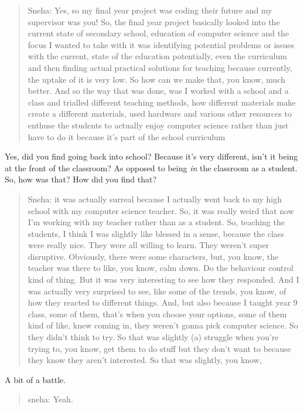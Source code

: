 \documentclass[
]{book}
\begin{document}
\begin{quote}
Sneha: Yes, so my final year project was coding their future and my supervisor was you! So, the final year project basically looked into the current state of secondary school, education of computer science and the focus I wanted to take with it was identifying potential problems or issues with the current, state of the education potentially, even the curriculum and then finding actual practical solutions for teaching because currently, the uptake of it is very low. So how can we make that, you know, much better. And so the way that was done, was I worked with a school and a class and trialled different teaching methods, how different materials make create a different materials, used hardware and various other resources to enthuse the students to actually enjoy computer science rather than just have to do it because it's part of the school curriculum
\end{quote}

Yes, did you find going back into school? Because it's very different, isn't it being at the front of the classroom? As opposed to being \emph{in} the classroom as a student. So, how was that? How did you find that?

\begin{quote}
Sneha: it was actually surreal because I actually went back to my high school with my computer science teacher. So, it was really weird that now I'm working with my teacher rather than as a student. So, teaching the students, I think I was slightly like blessed in a sense, because the class were really nice. They were all willing to learn. They weren't super disruptive. Obviously, there were some characters, but, you know, the teacher was there to like, you know, calm down. Do the behaviour control kind of thing. But it was very interesting to see how they responded. And I was actually very surprised to see, like some of the trends, you know, of how they reacted to different things. And, but also because I taught year 9 class, some of them, that's when you choose your options, some of them kind of like, knew coming in, they weren't gonna pick computer science. So they didn't think to try. So that was slightly (a) struggle when you're trying to, you know, get them to do stuff but they don't want to because they know they aren't interested. So that was slightly, you know,
\end{quote}

A bit of a battle.

\begin{quote}
sneha: Yeah.
\end{quote}
\end{document}
